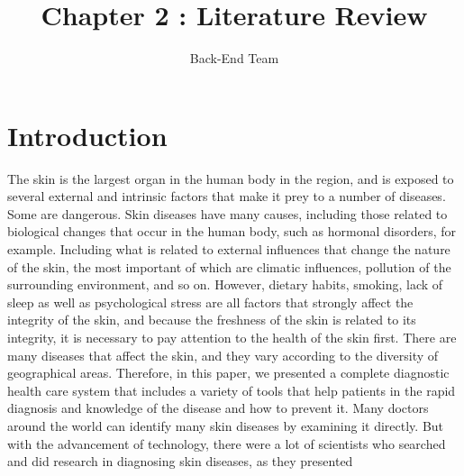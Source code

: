 \documentclass{article}
\title{Chapter 2 : Literature Review}
\author{Back-End Team}
\begin{document}
\maketitle

\section{Introduction}

The skin is the largest organ in the human body in the region, and is exposed to several external and intrinsic factors that make it prey to a number of diseases. Some are dangerous. Skin diseases have many causes, including those related to biological changes that occur in the human body, such as hormonal disorders, for example. Including what is related to external influences that change the nature of the skin, the most important of which are climatic influences, pollution of the surrounding environment, and so on. However, dietary habits, smoking, lack of sleep as well as psychological stress are all factors that strongly affect the integrity of the skin, and because the freshness of the skin is related to its integrity, it is necessary to pay attention to the health of the skin first. There are many diseases that affect the skin, and they vary according to the diversity of geographical areas. Therefore, in this paper, we presented a complete diagnostic health care system that includes a variety of tools that help patients in the rapid diagnosis and knowledge of the disease and how to prevent it.
Many doctors around the world can identify many skin diseases by examining it directly. But with the advancement of technology, there were a lot of scientists who searched and did research in diagnosing skin diseases, as they presented 
\end{document}
